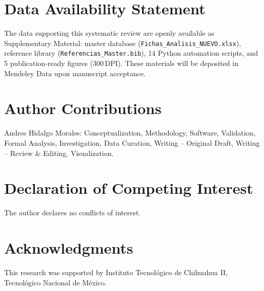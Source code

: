 \documentclass[review, 12pt, times]{elsarticle}
\begin{document}
\section*{Data Availability Statement}

The data supporting this systematic review are openly
available as Supplementary Material: master database
(\texttt{Fichas\_Analisis\_NUEVO.xlsx}), reference library
(\texttt{Referencias\_Master.bib}), 14 Python automation
scripts, and 5 publication-ready figures (300\,DPI). These
materials will be deposited in Mendeley Data upon
manuscript acceptance.

\section*{Author Contributions}

Andres Hidalgo Morales: Conceptualization, Methodology,
Software, Validation, Formal Analysis, Investigation, Data
Curation, Writing -- Original Draft, Writing -- Review \&
Editing, Visualization.

\section*{Declaration of Competing Interest}

The author declares no conflicts of interest.

\section*{Acknowledgments}

This research was supported by Instituto Tecnológico de
Chihuahua II, Tecnológico Nacional de México.



\end{document}
